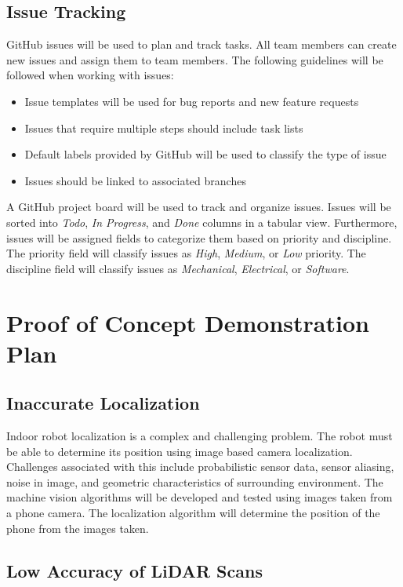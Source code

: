 \documentclass[titlepage]{article}
\begin{document}
\subsection{Issue Tracking}

GitHub issues will be used to plan and track tasks. All team members can create new issues and assign them to team members. The following guidelines will be followed when working with issues:

\begin{itemize}
\item Issue templates will be used for bug reports and new feature requests
\item Issues that require multiple steps should include task lists
\item Default labels provided by GitHub will be used to classify the type of issue
\item Issues should be linked to associated branches
\end{itemize}

A GitHub project board will be used to track and organize issues. Issues will be sorted into \textit{Todo}, \textit{In Progress}, and \textit{Done} columns in a tabular view. Furthermore, issues will be assigned fields to categorize them based on priority and discipline. The priority field will classify issues as \textit{High}, \textit{Medium}, or \textit{Low} priority. The discipline field will classify issues as \textit{Mechanical}, \textit{Electrical}, or \textit{Software}.

\section{Proof of Concept Demonstration Plan}

\subsection{Inaccurate Localization}
Indoor robot localization is a complex and challenging problem.
The robot must be able to determine its position using image based camera localization. Challenges associated with this include probabilistic sensor data, sensor aliasing, noise in image, and geometric characteristics of surrounding environment. The machine vision algorithms will be developed and tested using images taken from a phone camera. The localization algorithm will determine the position of the phone from the images taken.

\subsection{Low Accuracy of LiDAR Scans}
\end{document}
